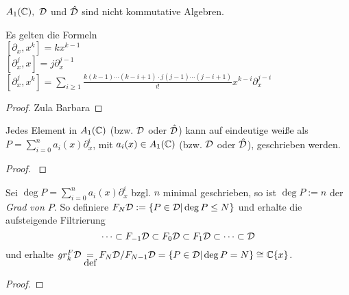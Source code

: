 \begin{rem}
  $A_1({\mathbb C}),~{\mathcal{D}}$ und $\hat{{\mathcal{D}}}$ sind nicht kommutative Algebren.
\end{rem}

\begin{lem}
  Es gelten die Formeln\\
  $ [\partial_x,x^k] = kx^{k-1} $\\
  $ [\partial_x^j,x] = j\partial_x^{j-1} $\\
  $ [\partial_x^j,x^k] = \sum_{i\geq1}\frac{k(k-1)\cdots(k-i+1)
    \cdot j(j-1)\cdots(j-i+1)}{i!}x^{k-i}\partial_x^{j-i} $
\end{lem}
\begin{proof}
  Zula Barbara
\end{proof}

\begin{prop} \label{prop:weyl_eindeutige_schreibung}
  Jedes Element in $A_1({\mathbb C})$ (bzw. ${\mathcal{D}}$ oder $\hat{{\mathcal{D}}}$) kann auf eindeutige
  weiße als $P=\sum_{i=0}^na_i(x)\partial_x^i$, mit $a_i(x)\in A_1({\mathbb C})$ (bzw.
  ${\mathcal{D}}$ oder $\hat{{\mathcal{D}}}$), geschrieben werden. 
\end{prop}
\begin{proof}
  \cite[Proposition 1.2.3]{sabbah_cimpa90}
  \begin{comment}
    ein teil des Beweises ist "left as an exersice"
  \end{comment}
\end{proof}


\begin{defn}
  Sei $\deg P=\sum_{i=0}^na_i(x)\partial_x^i$ bzgl. $n$ minimal geschrieben, so 
  ist $\deg P:=n$ der \emph{Grad von $P$}. So definiere 
  $F_N{\mathcal{D}}:=\{P\in{\mathcal{D}}|\deg P\leq N\}$ und erhalte die aufsteigende Filtrierung
  \[
    \cdots\subset F_{-1}{\mathcal{D}}\subset F_{0}{\mathcal{D}}\subset F_{1}{\mathcal{D}}\subset\cdots\subset{\mathcal{D}}
  \]
  und erhalte $gr_k^F{\mathcal{D}}\underset{\mbox{def}}{=}F_N{\mathcal{D}}\slash F_{N-1}{\mathcal{D}}
  =\{P\in{\mathcal{D}}|\deg P=N\}\cong{\mathbb C}\{x\}$.
\end{defn}

\begin{proof}
  \begin{comment}
    mit isom: $[P]=P+F_{N-1}\D\mapsto a_n(x)$
  \end{comment}
\end{proof}

